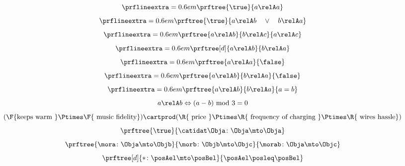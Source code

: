 {\begin{forslides}
\begin{equation}
        \label{eq:rel_refl}
        \prflineextra=0.6em
        \prftree{\true}{a\relA a}
    \end{equation}
    \begin{equation}
        \label{eq:rel_tot}
        \prflineextra=0.6em
        \prftree{\true}{a\relA b \quad \vee \quad b\relA a}
    \end{equation}
    \begin{equation}
        \label{eq:rel_tran}
        \prflineextra=0.6em
        \prftree{a\relA b}{b\relA c}{a\relA c}
    \end{equation}
    \begin{equation}
        \label{eq:rel_sym}
        \prflineextra=0.6em
        \prftree[d]{a \relA b}{b\relA a}
    \end{equation}
    \begin{equation}
        \label{eq:rel_irr}
        \prflineextra=0.6em
        \prftree{a \relA a}{\false}
    \end{equation}
    \begin{equation}
        \label{eq:rel_asy}
        \prflineextra=0.6em
        \prftree{a \relA b}{b\relA a}{\false}
    \end{equation}
    \begin{equation}
        \label{eq:rel_antisy}
        \prflineextra=0.6em
        \prftree{a \relA b}{b\relA a}{a=b}
    \end{equation}
    \begin{equation}
        \label{eq:ex}
        a\relA b \Leftrightarrow (a-b) \text{ mod }3=0
    \end{equation}
    \begin{equation}
        \label{eq:fun_cost}
        (\F{\text{keeps warm }}\Ptimes \F{\text{ music fidelity}})\cartprod(\R{\text{ price }} \Ptimes \R{\text{ frequency of charging }}\Ptimes \R{\text{ wires hassle}})
    \end{equation}
    \begin{equation}
        \label{eq:id_ex}
        \prftree{\true}{\catidat\Obja\colon \Obja \mto \Obja}
    \end{equation}
    \begin{equation}
        \label{eq:comp_cat}
        \prftree{\mora \colon \Obja \mto \Objb}{\morb\colon \Objb \mto \Objc}{\morab \colon \Obja \mto \Objc}
    \end{equation}
    \begin{equation}
        \label{eq:mor_pre}
        \prftree[d]{\ast\colon \posAel \mto \posBel}{\posAel \posleq \posBel}

\end{equation}
\end{forslides}}
